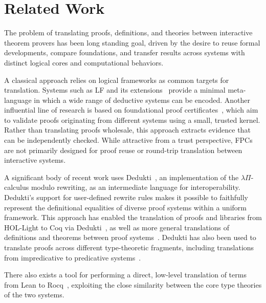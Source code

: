 \documentclass{article}
\theoremstyle{plain}
\theoremstyle{definition}
\theoremstyle{remark}
\begin{document}
	\section{Related Work}

        The problem of translating proofs, definitions, and theories
        between interactive theorem provers has been long standing
        goal, driven by the desire to reuse formal developments,
        compare foundations, and transfer results across systems with
        distinct logical cores and computational behaviors.

        A classical approach relies on logical frameworks as common
        targets for translation. Systems such as LF and its
        extensions~\cite{harper1993framework} provide a
        minimal meta-language in which a wide range of deductive
        systems can be encoded. 
        Another influential line of research is based on foundational
        proof certificates~\cite{chihani:hal-00906485}, which aim to
        validate proofs originating from different systems using a
        small, trusted kernel. Rather than translating proofs
        wholesale, this approach extracts evidence that can be
        independently checked. While attractive from a trust
        perspective, FPCs are not primarily designed for proof reuse
        or round-trip translation between interactive systems.

        A significant body of recent work uses Dedukti~\cite{Dedukti}, an
        implementation of the $\lambda\Pi$-calculus modulo rewriting,
        as an intermediate language for interoperability. Dedukti’s
        support for user-defined rewrite rules makes it possible to
        faithfully represent the definitional equalities of diverse
        proof systems within a uniform framework. This approach has
        enabled the translation of proofs and libraries from HOL-Light
        to Coq via Dedukti~\cite{Blanqui2024TranslatingHOLLight}, as
        well as more general translations of definitions and theorems
        between proof
        systems~\cite{FrédéricBlanqui2024Libraries}. Dedukti has also
        been used to translate proofs across different type-theoretic
        fragments, including translations from impredicative to
        predicative systems~\cite{FelicissimoBlanquiBarnawal2023}.

        There also exists a tool for performing a direct, low-level
        translation of terms from Lean to
        Rocq~\cite{leantypechecker}, exploiting the close similarity
        between the core type theories of the two systems.
        
\end{document}
